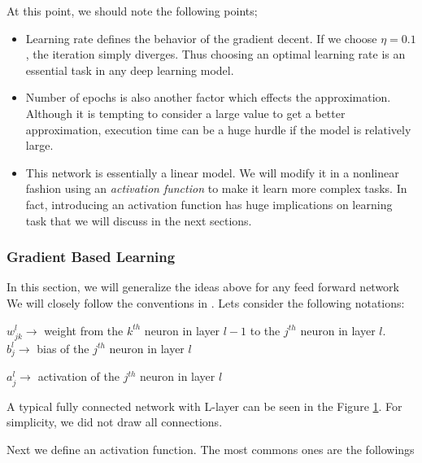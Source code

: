 \documentclass[12pt]{article}
\begin{document}
At this point, we should note the following points;
\begin{itemize}
\item Learning rate defines the behavior of the gradient decent. If we choose $\eta=0.1$, the iteration simply diverges. Thus choosing an optimal learning rate is an essential task in any deep learning model.

\item Number of epochs is also another factor which effects the approximation. Although it is tempting to consider a large value to get a better approximation, execution time can be a huge hurdle if the model is relatively large.

\item This network is essentially a linear model. We will modify it in a nonlinear fashion using an \textit{activation function} to make it  learn more complex tasks. In fact, introducing an activation function has huge implications on learning task that we will discuss in the next sections. 
 
\end{itemize}



\subsubsection{Gradient Based Learning}
\label{sec:GBL}

In this section, we will generalize the ideas above for any feed forward network  We will closely follow the conventions in \cite{DnnBook}. Lets consider the following notations:
\begin{tcolorbox}
\begin{flushleft}
$w_{jk}^{l} \rightarrow$ weight from the $k^{th}$ neuron in layer $l-1$ to the $j^{th}$ neuron in layer $l$. \\

$b_{j}^{l} \rightarrow$ bias of the $j^{th}$ neuron in layer $l$

$a_{j}^{l} \rightarrow$ activation of the $j^{th}$ neuron in layer $l$
\end{flushleft}
\end{tcolorbox}
A typical fully connected network with L-layer can be seen in the Figure \ref{fig:FCL}. For simplicity, we did not draw all connections.


\begin{figure}[H]
  \centering
  \label{fig:FCL}
\end{figure}
Next we define an activation function. The most commons ones are the followings
\end{document}
